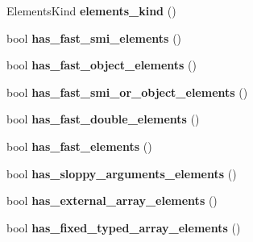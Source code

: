 \begin{DoxyCompactItemize}
\item 
\hypertarget{classv8_1_1internal_1_1_map_a051598779de355f1b9f1aea0210b74ef}{}Elements\+Kind {\bfseries elements\+\_\+kind} ()\label{classv8_1_1internal_1_1_map_a051598779de355f1b9f1aea0210b74ef}

\item 
\hypertarget{classv8_1_1internal_1_1_map_ac761a656b1ef453177f3f393e2f43f44}{}bool {\bfseries has\+\_\+fast\+\_\+smi\+\_\+elements} ()\label{classv8_1_1internal_1_1_map_ac761a656b1ef453177f3f393e2f43f44}

\item 
\hypertarget{classv8_1_1internal_1_1_map_ac93ff4771fb7c04c91dcbb2349e6256e}{}bool {\bfseries has\+\_\+fast\+\_\+object\+\_\+elements} ()\label{classv8_1_1internal_1_1_map_ac93ff4771fb7c04c91dcbb2349e6256e}

\item 
\hypertarget{classv8_1_1internal_1_1_map_a38482d438f917f30fd695bae568fc5ed}{}bool {\bfseries has\+\_\+fast\+\_\+smi\+\_\+or\+\_\+object\+\_\+elements} ()\label{classv8_1_1internal_1_1_map_a38482d438f917f30fd695bae568fc5ed}

\item 
\hypertarget{classv8_1_1internal_1_1_map_ab62c42ca3179a9a3e8a0a8610e29388f}{}bool {\bfseries has\+\_\+fast\+\_\+double\+\_\+elements} ()\label{classv8_1_1internal_1_1_map_ab62c42ca3179a9a3e8a0a8610e29388f}

\item 
\hypertarget{classv8_1_1internal_1_1_map_a41e77f7ac129e40fa144c8db4c0851f0}{}bool {\bfseries has\+\_\+fast\+\_\+elements} ()\label{classv8_1_1internal_1_1_map_a41e77f7ac129e40fa144c8db4c0851f0}

\item 
\hypertarget{classv8_1_1internal_1_1_map_ac536a3ce7e056be835d883f54731d122}{}bool {\bfseries has\+\_\+sloppy\+\_\+arguments\+\_\+elements} ()\label{classv8_1_1internal_1_1_map_ac536a3ce7e056be835d883f54731d122}

\item 
\hypertarget{classv8_1_1internal_1_1_map_a02567bc214afb41c74599662d92b7324}{}bool {\bfseries has\+\_\+external\+\_\+array\+\_\+elements} ()\label{classv8_1_1internal_1_1_map_a02567bc214afb41c74599662d92b7324}

\item 
\hypertarget{classv8_1_1internal_1_1_map_a75abe0c0df4ee0e1c1a36e5021e1e8e6}{}bool {\bfseries has\+\_\+fixed\+\_\+typed\+\_\+array\+\_\+elements} ()\label{classv8_1_1internal_1_1_map_a75abe0c0df4ee0e1c1a36e5021e1e8e6}


\end{DoxyCompactItemize}
